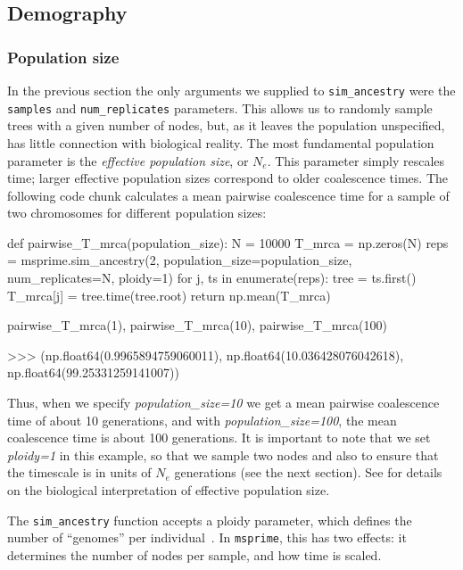 \documentclass[graybox]{svmult}
\newcommand{\msprime}[0]{\texttt{msprime}}
\begin{document}
\subsection{Demography}\label{Demography}

\subsubsection{Population size}\label{population-models}

In the previous section the only arguments we supplied to
\texttt{sim\_ancestry} were the \texttt{samples} and
\texttt{num\_replicates} parameters. This allows us to randomly sample
trees with a given number of nodes, but, as it leaves the population
unspecified, has little connection with
biological reality. The most fundamental population parameter is the \emph{effective population size}, or
\(N_e\). This parameter simply rescales time; larger effective
population sizes correspond to older coalescence times. The following code chunk
calculates a mean pairwise coalescence time for a sample of two chromosomes
for different population sizes:

\begin{pythoncode}
def pairwise_T_mrca(population_size):
    N = 10000
    T_mrca = np.zeros(N)
    reps = msprime.sim_ancestry(2, population_size=population_size,
        num_replicates=N, ploidy=1)
    for j, ts in enumerate(reps):
        tree = ts.first()
        T_mrca[j] = tree.time(tree.root)
    return np.mean(T_mrca)

pairwise_T_mrca(1), pairwise_T_mrca(10), pairwise_T_mrca(100)

>>> (np.float64(0.9965894759060011),
     np.float64(10.036428076042618),
     np.float64(99.25331259141007))

\end{pythoncode}

Thus, when we specify \emph{population\_size=10} we get a mean pairwise coalescence time of about
10 generations, and with \emph{population\_size=100}, the mean coalescence time is about
100 generations. It is important to note that we set \emph{ploidy=1} in
this example, so that we sample two nodes and also to ensure that the timescale
is in units of $N_e$ generations (see the next section).
See \cite{wakely2008coalescent} for details on the
biological interpretation of effective population size.

\label{ploidy}
The \texttt{sim\_ancestry} function accepts a ploidy parameter, which defines
the number of ``genomes'' per individual~\cite{wong2024general}.
In \msprime, this has two effects: it determines the number of nodes
per sample, and how time is scaled.
\end{document}

